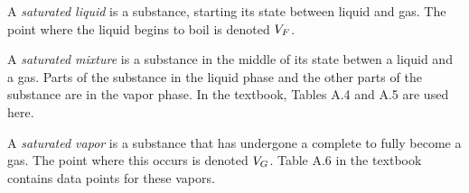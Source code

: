 \begin{definition}\label{def:Saturated_Liquid}
  A \emph{saturated liquid} is a substance, starting its  state between liquid and gas.
  The point where the liquid begins to boil is denoted $V_{F}$.
\end{definition}

\begin{definition}\label{def:Saturated_Mixture}
  A \emph{saturated mixture} is a substance in the middle of its  state betwen a liquid and a gas.
  Parts of the substance in the liquid phase and the other parts of the substance are in the vapor phase.
  In the textbook, Tables A.4 and A.5 are used here.
\end{definition}

\begin{definition}\label{def:Saturated_Vapor}
  A \emph{saturated vapor} is a substance that has undergone a complete  to fully become a gas.
  The point where this occurs is denoted $V_{G}$.
  Table A.6 in the textbook contains data points for these vapors.
\end{definition}


